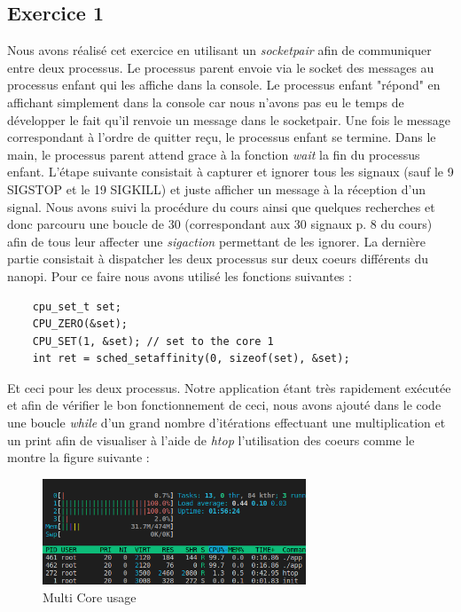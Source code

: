 \documentclass{ReportTemplate}
\begin{document}
\subsection{Exercice 1}
Nous avons réalisé cet exercice en utilisant un \textit{socketpair} afin de
communiquer entre deux processus. Le processus parent envoie via le socket des
messages au processus enfant qui les affiche dans la console. Le processus
enfant "répond" en affichant simplement dans la console car nous n'avons pas eu
le temps de développer le fait qu'il renvoie un message dans le socketpair. Une
fois le message correspondant à l'ordre de quitter reçu, le processus enfant se
termine. Dans le main, le processus parent attend grace à la fonction
\textit{wait} la fin du processus enfant.\newline
L'étape suivante consistait à capturer et ignorer tous les signaux (sauf le 9
SIGSTOP et le 19 SIGKILL) et juste afficher un message à la réception d'un
signal. Nous avons suivi la procédure du cours ainsi que quelques recherches et
donc parcouru une boucle de 30 (correspondant aux 30 signaux p. 8 du cours) afin
de tous leur affecter une \textit{sigaction} permettant de les ignorer.\newline
La dernière partie consistait à dispatcher les deux processus sur deux coeurs
différents du nanopi. Pour ce faire nous avons utilisé les fonctions suivantes :
\begin{verbatim}
    cpu_set_t set;
    CPU_ZERO(&set);
    CPU_SET(1, &set); // set to the core 1
    int ret = sched_setaffinity(0, sizeof(set), &set);
\end{verbatim}
Et ceci pour les deux processus. Notre application étant très rapidement
exécutée et afin de vérifier le bon fonctionnement de ceci, nous avons ajouté
dans le code une boucle \textit{while} d'un grand nombre d'itérations effectuant
une multiplication et un print afin de visualiser à l'aide de \textit{htop}
l'utilisation des coeurs comme le montre la figure suivante :
\begin{figure}[H]
    \centering
    \includegraphics[width=0.7\textwidth]{imageSources/MultiCPU.png.png}
    \caption{Multi Core usage}
    \label{fig:MultiCore}
\end{figure}
\end{document}
